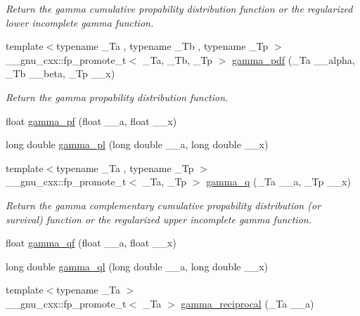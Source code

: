 \begin{DoxyCompactItemize}
\begin{DoxyCompactList}\small\item\em Return the gamma cumulative propability distribution function or the regularized lower incomplete gamma function. \end{DoxyCompactList}\item 
{\footnotesize template$<$typename \+\_\+\+Ta , typename \+\_\+\+Tb , typename \+\_\+\+Tp $>$ }\\\+\_\+\+\_\+gnu\+\_\+cxx\+::fp\+\_\+promote\+\_\+t$<$ \+\_\+\+Ta, \+\_\+\+Tb, \+\_\+\+Tp $>$ \hyperlink{group__mathsf__gnu_ga55f530c37387a6c10c601c5838f3be00}{gamma\+\_\+pdf} (\+\_\+\+Ta \+\_\+\+\_\+alpha, \+\_\+\+Tb \+\_\+\+\_\+beta, \+\_\+\+Tp \+\_\+\+\_\+x)
\begin{DoxyCompactList}\small\item\em Return the gamma propability distribution function. \end{DoxyCompactList}\item 
float \hyperlink{group__mathsf__gnu_gac9a59be05877d3c14fa95bebcf15e8df}{gamma\+\_\+pf} (float \+\_\+\+\_\+a, float \+\_\+\+\_\+x)
\item 
long double \hyperlink{group__mathsf__gnu_gaa37f4adf9942ce8e095f440963b330a6}{gamma\+\_\+pl} (long double \+\_\+\+\_\+a, long double \+\_\+\+\_\+x)
\item 
{\footnotesize template$<$typename \+\_\+\+Ta , typename \+\_\+\+Tp $>$ }\\\+\_\+\+\_\+gnu\+\_\+cxx\+::fp\+\_\+promote\+\_\+t$<$ \+\_\+\+Ta, \+\_\+\+Tp $>$ \hyperlink{group__mathsf__gnu_ga10c246b2fa2ce000dc5d7c81e9e98c58}{gamma\+\_\+q} (\+\_\+\+Ta \+\_\+\+\_\+a, \+\_\+\+Tp \+\_\+\+\_\+x)
\begin{DoxyCompactList}\small\item\em Return the gamma complementary cumulative propability distribution (or survival) function or the regularized upper incomplete gamma function. \end{DoxyCompactList}\item 
float \hyperlink{group__mathsf__gnu_ga3ee8d2c40b904952538709cbb0e664a4}{gamma\+\_\+qf} (float \+\_\+\+\_\+a, float \+\_\+\+\_\+x)
\item 
long double \hyperlink{group__mathsf__gnu_ga5364a098596681809294d25741539ffc}{gamma\+\_\+ql} (long double \+\_\+\+\_\+a, long double \+\_\+\+\_\+x)
\item 
{\footnotesize template$<$typename \+\_\+\+Ta $>$ }\\\+\_\+\+\_\+gnu\+\_\+cxx\+::fp\+\_\+promote\+\_\+t$<$ \+\_\+\+Ta $>$ \hyperlink{group__mathsf__gnu_ga641f9bcdb8fc32a9a0ce7a15b5040076}{gamma\+\_\+reciprocal} (\+\_\+\+Ta \+\_\+\+\_\+a)

\end{DoxyCompactItemize}
